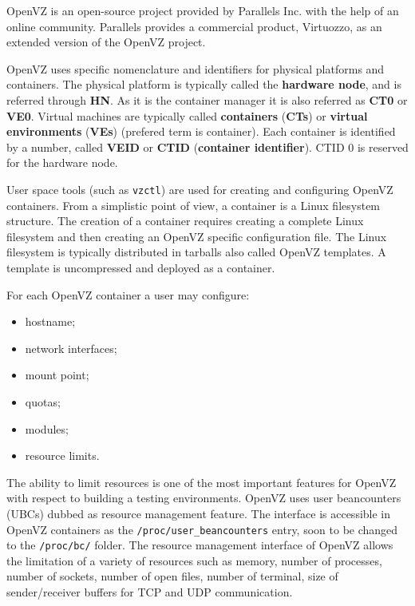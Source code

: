OpenVZ is an open-source project provided by Parallels Inc. with the help of
an online community. Parallels provides a commercial product, Virtuozzo, as an
extended version of the OpenVZ project.

OpenVZ uses specific nomenclature and identifiers for physical platforms and
containers. The physical platform is typically called the \textbf{hardware
node}, and is referred through \textbf{HN}. As it is the container manager it
is also referred as \textbf{CT0} or \textbf{VE0}. Virtual machines are
typically called \textbf{containers} (\textbf{CTs}) or \textbf{virtual
environments} (\textbf{VEs}) (prefered term is container). Each container is
identified by a number, called \textbf{VEID} or \textbf{CTID}
(\textbf{container identifier}). CTID 0 is reserved for the hardware node.

User space tools (such as \texttt{vzctl}) are used for creating and
configuring OpenVZ containers. From a simplistic point of view, a container is
a Linux filesystem structure. The creation of a container requires creating a
complete Linux filesystem and then creating an OpenVZ specific configuration
file. The Linux filesystem is typically distributed in tarballs also called
OpenVZ templates. A template is uncompressed and deployed as a container.

For each OpenVZ container a user may configure:

\begin{itemize}
  \item hostname;
  \item network interfaces;
  \item mount point;
  \item quotas;
  \item modules;
  \item resource limits.
\end{itemize}

The ability to limit resources is one of the most important features for
OpenVZ with respect to building a testing environments. OpenVZ uses user
beancounters (UBCs) dubbed as resource management feature. The interface is
accessible in OpenVZ containers as the \texttt{/proc/user\_beancounters} entry,
soon to be changed to the \texttt{/proc/bc/} folder. The resource management
interface of OpenVZ allows the limitation of a variety of resources such as
memory, number of processes, number of sockets, number of open files, number
of terminal, size of sender/receiver buffers for TCP and UDP communication.

